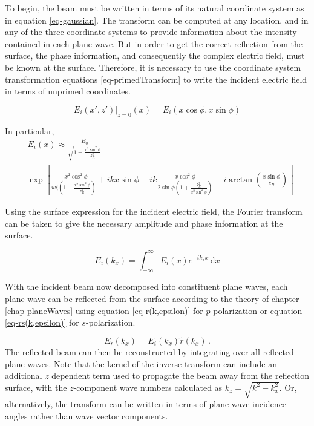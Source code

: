 \documentclass[12pt]{uthesis-v12}
\begin{document}
To begin, the beam must be written in terms of its natural coordinate system as in equation \ref{eq-gaussian}. The transform can be computed at any location, and in any of the three coordinate systems to provide information about the intensity contained in each plane wave. But in order to get the correct reflection from the surface, the phase information, and consequently the complex electric field, must be known at the surface. Therefore, it is necessary to use the coordinate system transformation equations \ref{eq-primedTransform} to write the incident electric field in terms of unprimed coordinates.

\begin{equation}
\left. E_i(x', z') \right|_{z=0}(x) = E_i(x\cos\phi, x\sin\phi)
\end{equation}

In particular,
\begin{equation}\label{eq-gaussianSurface}
\begin{aligned}
&E_i(x) \approx \frac{E_0}{\sqrt{1+\frac{x^2\sin^2\phi}{z_R^2}}} \\
 &\exp\left[
  \frac{-x^2\cos^2\phi}{w_0^2\left(1+\frac{x^2\sin^2\phi}{z_R^2}\right)}
  +ikx\sin\phi
  -ik\frac{x\cos^2\phi}{2\sin\phi\left(1+\frac{z_R^2}{x^2\sin^2\phi}\right)}
  +i\arctan\left(\frac{x\sin\phi}{z_R}\right)
\right]
\end{aligned}
\end{equation}

Using the surface expression for the incident electric field, the Fourier transform can be taken to give the necessary amplitude and phase information at the surface.

\begin{equation}\label{eq-fourierTransform}
E_i(k_x)=\int_{-\infty}^\infty E_i(x) e^{-ik_xx}\,\mathrm{d}x
\end{equation}

With the incident beam now decomposed into constituent plane waves, each plane wave can be reflected from the surface according to the theory of chapter \ref{chap-planeWaves} using equation \ref{eq-r(k,epsilon)} for $p$-polarization or equation \ref{eq-rs(k,epsilon)} for $s$-polarization.

\begin{equation}
E_r(k_x) = E_i(k_x) \tilde{r}(k_x)\,.
\end{equation}
The reflected beam can then be reconstructed by integrating over all reflected plane waves. Note that the kernel of the inverse transform can include an additional $z$ dependent term used to propagate the beam away from the reflection surface, with the $z$-component wave numbers calculated as $k_z = \sqrt{k^2-k_x^2}$. Or, alternatively, the transform can be written in terms of plane wave incidence angles rather than wave vector components.
\end{document}
